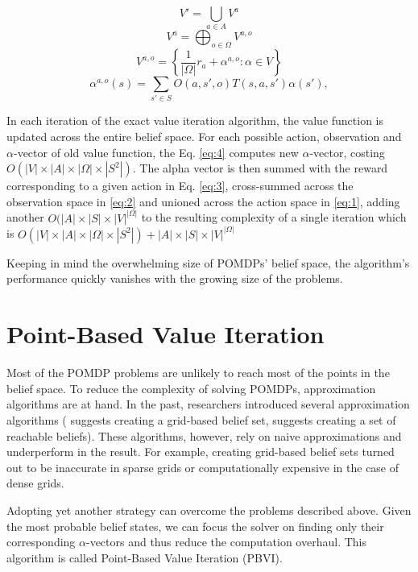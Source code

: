 \begin{equation} \label{eq:1} V' = \bigcup_{a \in A} V^a \end{equation}
\begin{equation} \label{eq:2} V^a = \bigoplus_{o \in \Omega} V^{a,o} \end{equation}
\begin{equation} \label{eq:3} V^{a,o} = \left\{\dfrac{1}{|\Omega|} r_a + \alpha^{a, o} : \alpha \in V \right\} \end{equation} 
\begin{equation} \label{eq:4} \alpha^{a, o}(s) = \sum_{s' \in S} O(a, s', o) T(s, a, s') \alpha(s'),\end{equation}

In each iteration of the exact value iteration algorithm, the value function is updated across the entire belief space. For each possible action, observation and $\alpha$-vector of old value function, the Eq. \ref{eq:4} computes new $\alpha$-vector, costing $O(|V| \times |A| \times |\Omega| \times |S^2|)$. The alpha vector is then summed with the reward corresponding to a given action in Eq. \ref{eq:3}, cross-summed across the observation space in \ref{eq:2} and unioned across the action space in \ref{eq:1}, adding another $O(|A| \times |S| \times |V|^{|\Omega|}$ to the resulting complexity of a single iteration which is $O(|V| \times |A| \times |\Omega| \times |S^2|) + |A| \times |S| \times |V|^{|\Omega|}$ 

 Keeping in mind the overwhelming size of POMDPs' belief space, the algorithm's performance quickly vanishes with the growing size of the problems.


\section{Point-Based Value Iteration}

Most of the POMDP problems are unlikely to reach most of the points in the belief space. To reduce the complexity of solving POMDPs, approximation algorithms are at hand. In the past, researchers introduced several approximation algorithms (\cite{10.2307/171496} suggests creating a grid-based belief set, \cite{Hauskrecht00} suggests creating a set of reachable beliefs). These algorithms, however, rely on naive approximations and underperform in the result. For example, creating grid-based belief sets turned out to be inaccurate in sparse grids or computationally expensive in the case of dense grids.

Adopting yet another strategy can overcome the problems described above. Given the most probable belief states, we can focus the solver on finding only their corresponding $\alpha$-vectors and thus reduce the computation overhaul. This algorithm is called Point-Based Value Iteration (PBVI).

